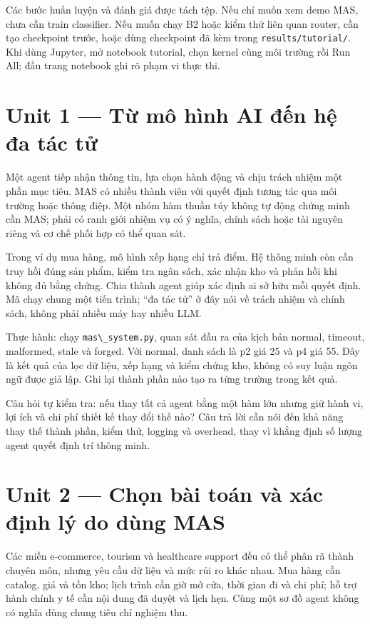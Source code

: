 Các bước huấn luyện và đánh giá được tách tệp. Nếu chỉ muốn xem demo
MAS, chưa cần train classifier. Nếu muốn chạy B2 hoặc kiểm thử liên quan
router, cần tạo checkpoint trước, hoặc dùng checkpoint đã kèm trong
\passthrough{\lstinline!results/tutorial/!}. Khi dùng Jupyter, mở
notebook tutorial, chọn kernel cùng môi trường rồi Run All; đầu trang
notebook ghi rõ phạm vi thực thi.

\section{Unit 1 --- Từ mô hình AI đến hệ đa tác
tử}\label{unit-1-tux1eeb-muxf4-huxecnh-ai-ux111ux1ebfn-hux1ec7-ux111a-tuxe1c-tux1eed}

Một agent tiếp nhận thông tin, lựa chọn hành động và chịu trách nhiệm
một phần mục tiêu. MAS có nhiều thành viên với quyết định tương tác qua
môi trường hoặc thông điệp. Một nhóm hàm thuần túy không tự động chứng
minh cần MAS; phải có ranh giới nhiệm vụ có ý nghĩa, chính sách hoặc tài
nguyên riêng và cơ chế phối hợp có thể quan sát.

Trong ví dụ mua hàng, mô hình xếp hạng chỉ trả điểm. Hệ thông minh còn
cần truy hồi đúng sản phẩm, kiểm tra ngân sách, xác nhận kho và phản hồi
khi không đủ bằng chứng. Chia thành agent giúp xác định ai sở hữu mỗi
quyết định. Mã chạy chung một tiến trình; ``đa tác tử'' ở đây nói về
trách nhiệm và chính sách, không phải nhiều máy hay nhiều LLM.

Thực hành: chạy \passthrough{\lstinline!mas\_system.py!}, quan sát đầu
ra của kịch bản normal, timeout, malformed, stale và forged. Với normal,
danh sách là p2 giá 25 và p4 giá 55. Đây là kết quả của lọc dữ liệu, xếp
hạng và kiểm chứng kho, không có suy luận ngôn ngữ được giả lập. Ghi lại
thành phần nào tạo ra từng trường trong kết quả.

Câu hỏi tự kiểm tra: nếu thay tất cả agent bằng một hàm lớn nhưng giữ
hành vi, lợi ích và chi phí thiết kế thay đổi thế nào? Câu trả lời cần
nói đến khả năng thay thế thành phần, kiểm thử, logging và overhead,
thay vì khẳng định số lượng agent quyết định trí thông minh.

\section{Unit 2 --- Chọn bài toán và xác định lý do dùng
MAS}\label{unit-2-chux1ecdn-buxe0i-touxe1n-vuxe0-xuxe1c-ux111ux1ecbnh-luxfd-do-duxf9ng-mas}

Các miền e-commerce, tourism và healthcare support đều có thể phân rã
thành chuyên môn, nhưng yêu cầu dữ liệu và mức rủi ro khác nhau. Mua
hàng cần catalog, giá và tồn kho; lịch trình cần giờ mở cửa, thời gian
đi và chi phí; hỗ trợ hành chính y tế cần nội dung đã duyệt và lịch hẹn.
Cùng một sơ đồ agent không có nghĩa dùng chung tiêu chí nghiệm thu.

